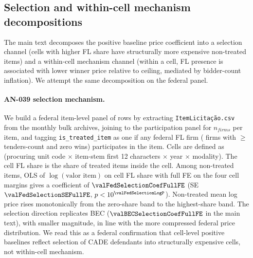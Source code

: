 \subsection{Selection and within-cell mechanism decompositions}
\label{app:comprasnet_decomp}

The main text decomposes the positive baseline price coefficient
into a selection channel (cells with higher FL share have
structurally more expensive non-treated items) and a within-cell
mechanism channel (within a cell, FL presence is associated with
lower winner price relative to ceiling, mediated by bidder-count
inflation). We attempt the same decomposition on the federal
panel.

\paragraph{AN-039 \textemdash{} selection mechanism.}
We build a federal item-level panel of \valFedItemPanelRows{}
rows by extracting \texttt{ItemLicita\c{c}\~ao.csv} from the
\valFedZipMonths{} monthly bulk archives, joining to the
participation panel for $n_{firms}$ per item, and tagging
\texttt{is\_treated\_item} as one if any federal FL firm
(\valFedFLcount{} firms with $\geq$ \valFedFLthreshold{}
tenders-count and zero wins) participates in the item. Cells are
defined as (procuring unit code $\times$ item-stem first 12
characters $\times$ year $\times$ modality). The cell FL share is
the share of treated items inside the cell. Among
\valFedItemPanelNonTreated{} non-treated items, OLS of
$\log(\text{valor item})$ on cell FL share with full FE on the
four cell margins gives a coefficient of
$\valFedSelectionCoefFullFE$ (SE $\valFedSelectionSEFullFE$,
$p < 10^{\valFedSelectionLogP}$). Non-treated mean log price
rises monotonically from the zero-share band to the
highest-share band. The selection direction replicates BEC
($\valBECSelectionCoefFullFE$ in the main text), with smaller
magnitude, in line with the more compressed federal price
distribution. We read this as a federal confirmation that
cell-level positive baselines reflect selection of CADE
defendants into structurally expensive cells, not within-cell
mechanism.

